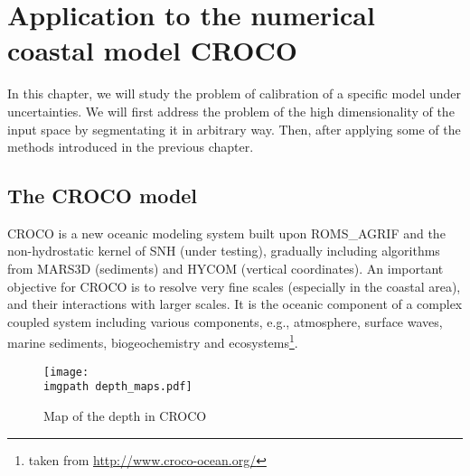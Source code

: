 \documentclass[../../Main_ManuscritThese.tex]{subfiles}
\newcommand\imgpath{/home/victor/acadwriting/Manuscrit/Text/Chapter5/img/}
\begin{document}
\chapter{Application to the numerical coastal model CROCO}
\label{chap:croco}
\minitoc
\newpage
\subfileLocal{\pagestyle{contentStyle}}
In this chapter, we will study the problem of calibration of a specific model under uncertainties. We will first address the problem of the high dimensionality of the input space by segmentating it in arbitrary way. Then, after applying some of the methods introduced in the previous chapter.


\section{The CROCO model}
CROCO is a new oceanic modeling system built upon ROMS\_AGRIF and the non-hydrostatic kernel of SNH (under testing), gradually including algorithms from MARS3D (sediments)  and HYCOM (vertical coordinates). An important objective for CROCO is to resolve very fine scales (especially in the coastal area), and their interactions with larger scales. It is the oceanic component of a complex coupled system including various components, e.g., atmosphere, surface waves, marine sediments, biogeochemistry and ecosystems\footnote{taken from \url{http://www.croco-ocean.org/}}.
\cite{mcwilliams_irreducible_2007}\cite{zanna_ocean_2011}
\begin{figure}[ht]
  \centering
  \texttt{[image: \\imgpath depth\_maps.pdf]}
  \caption{\label{fig:depth_maps} Map of the depth in CROCO}
\end{figure}
\end{document}
